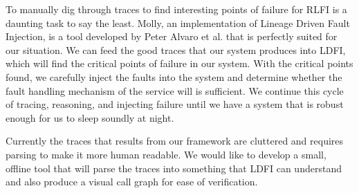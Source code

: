 To manually dig through traces to find interesting points of failure for RLFI is a daunting task to say the least. Molly, an implementation of Lineage Driven Fault Injection, is a tool developed by Peter Alvaro et al.\cite{alvaro:ldfi} that is perfectly suited for our situation. We can feed the good traces that our system produces into LDFI, which will find the critical points of failure in our system. With the critical points found, we carefully inject the faults into the system and determine whether the fault handling mechanism of the service will is sufficient. We continue this cycle of tracing, reasoning, and injecting failure until we have a system that is robust enough for us to sleep soundly at night.

Currently the traces that results from our framework are cluttered and requires parsing to make it more human readable. We would like to develop a small, offline tool that will parse the traces into something that LDFI can understand and also produce a visual call graph for ease of verification. 

